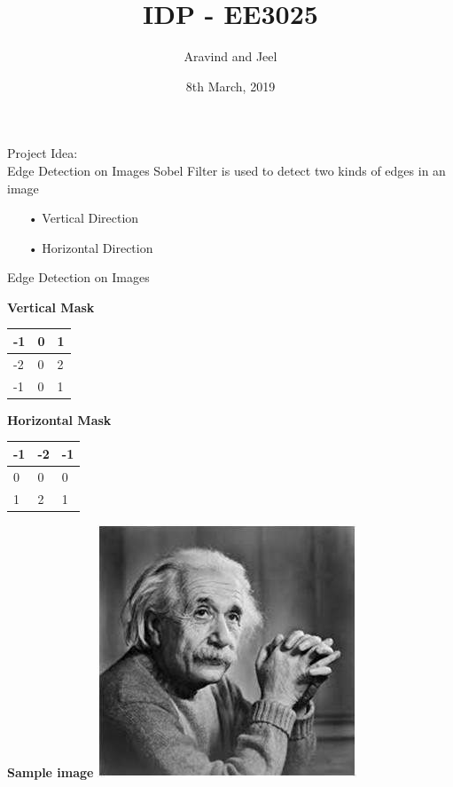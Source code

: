 \documentclass[11pt]{beamer}
\author{Aravind and Jeel}
\title{IDP - EE3025}
\institute{IIT Hyderabad}
\date{8th March, 2019}
\begin{document}
\begin{frame}
\titlepage
\end{frame}

\begin{frame}{Project Idea: \\ Edge Detection on Images}
	\textsf{Sobel Filter is used to detect two kinds of edges in an image} \\
	\begin{itemize}
	\item[•] Vertical Direction
	\item[•] Horizontal Direction
	\end{itemize}
	
\end{frame}

\begin{frame}{Edge Detection on Images}
	
	\textbf{Vertical Mask}
	\begin{center}
	
	\begin{tabular}{|m{1cm}|m{1cm}|m{1cm}|}
	\hline
	-1 & 0 & 1 \\
	\hline
	-2 & 0 & 2 \\
	\hline
	-1 & 0 & 1 \\
	\hline
	
	\end{tabular}
	\end{center}
	\pause
	\textbf{Horizontal Mask}
	\begin{center}
	
	\begin{tabular}{|m{1cm}|m{1cm}|m{1cm}|}
	\hline
	-1 & -2 & -1 \\
	\hline
	0 & 0 & 0 \\
	\hline
	1 & 2 & 1 \\
	\hline
	
	\end{tabular}
	\end{center}
	
\end{frame}

\begin{frame}
\textbf{Sample image}
\includegraphics{sobel1}
\end{frame}
\end{document}
